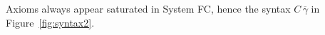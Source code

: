 \documentclass[a4paper,UKenglish]{lipics}
\def\fiddle#1{\hspace*{-0.8ex}\raisebox{0.1ex}{$\scriptscriptstyle#1$}}
\newcommand{\wfco}{\vdash^{\fiddle{\sf{co}}}}
\newcommand{\psim}{\mathrel{\sim_{\tiny \#}}}
\def\ruleform#1{\fbox{$#1$}}
\newcommand{\ol}[1]{\overline{#1}}
\newcommand{\cval}{\textsf{cv}}
\newcommand{\lifting}[2]{[#1]{\uparrow}(#2)}
\newcommand{\refl}[1]{\langle#1\rangle}  %
\newcommand{\tcase}[2]{\mathbf{case}\;#1\;\mathbf{of}\;\ol{#2}}
\newcommand{\tcast}[2]{#1\;\triangleright\;#2}
\newcommand{\es}{\ol{e}}
\newcommand{\gammas}{\ol{\gamma}}
\newcommand{\phis}{\ol{\phi}}
\newcommand{\taus}{\ol{\tau}}
\begin{document}
Axioms always appear saturated in System FC, hence the syntax $C\,\overline{\gamma}$ in Figure~\ref{fig:syntax2}.

\end{document}
